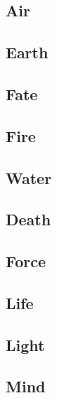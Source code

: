 \begin{multicols}{2}

\subsection{Air}


\subsection{Earth}


\subsection{Fate}


\subsection{Fire}


\subsection{Water}


\subsection{Death}


\subsection{Force}


\subsection{Life}


\subsection{Light}


\subsection{Mind}


\end{multicols}

